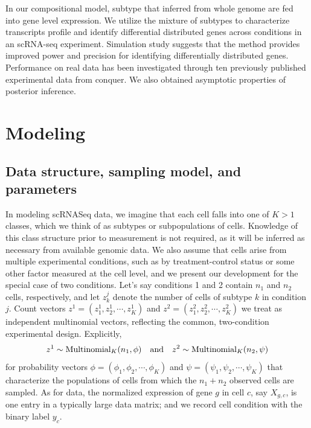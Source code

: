 \documentclass[11pt]{amsart}
\begin{document}
 
In our compositional model, subtype that inferred from whole genome are fed into gene level expression. 
We utilize the mixture of subtypes to characterize transcripts profile and identify differential distributed genes across conditions in an scRNA-seq experiment.
Simulation study suggests that the method provides improved power and precision for identifying differentially distributed genes. 
Performance on real data has been investigated through ten previously published experimental data from conquer\cite{ref:Cq}. 
We also obtained asymptotic properties of posterior inference. 

\section{Modeling}
\subsection{Data structure, sampling model, and parameters}
In modeling scRNASeq data, we
imagine that each cell falls into one of $K>1$ classes, which we think of as
subtypes or subpopulations of cells.   Knowledge of this class structure
 prior to measurement is not required, as it will be inferred as necessary from
 available genomic data.  We also assume that cells arise from multiple
experimental conditions, such as by treatment-control status or some other factor
 measured at the cell level, and we present our development for the special
case of two conditions.
Let's say conditions 1 and 2 contain $n_1$ and $n_2$ cells, respectively, and
let $z^j_k$ denote the number of cells of subtype $k$ in condition $j$.
Count vectors $z^1 = (z^1_1, z^1_2, \cdots, z^1_K )$ and 
$z^2 = (z^2_1, z^2_2, \cdots, z^2_K)$ we treat as independent multinomial
vectors, reflecting the common, two-condition experimental design.
Explicitly,
\begin{eqnarray*}
z^1 \sim \text{Multinomial}_K( n_1, \phi ) \quad {\mbox {\rm and}} \quad
z^2 \sim \text{Multinomial}_K( n_2, \psi )
\end{eqnarray*}
for probability vectors 
$\phi = (\phi_1, \phi_2, \cdots, \phi_K)$ and 
 $\psi = ( \psi_1, \psi_2, \cdots, \psi_K)$ that characterize the populations of
cells from which the $n_1+n_2$ observed cells are sampled.
As for data, the 
normalized expression of gene $g$ in cell $c$, say $X_{g,c}$, is one entry
in a typically large data matrix; and we record cell condition with the binary
label $y_c$.   
\end{document}
